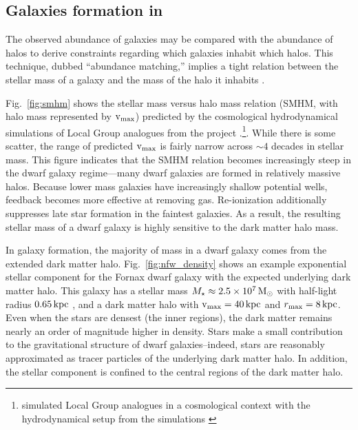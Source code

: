 \subsection{\texorpdfstring{Galaxies formation in
\LCDM{}}{Galaxies formation in }}\label{galaxies-formation-in}

The observed abundance of galaxies may be compared with the abundance of
\LCDM{} halos to derive constraints regarding which galaxies inhabit
which halos. This technique, dubbed ``abundance matching,'' implies a
tight relation between the stellar mass of a galaxy and the mass of the
halo it inhabits \citep{li+white2009, moster+naab+white2013}.

Fig.~\ref{fig:smhm} shows the stellar mass versus halo mass relation
(SMHM, with halo mass represented by \({\rm v}_{\rm max}\)) predicted by the \LCDM{}
cosmological hydrodynamical simulations of Local Group analogues from
the \apostle{} project \citep{sawala+2016}.\footnote{\apostle{}
  simulated Local Group analogues in a \LCDM{} cosmological context with
  the hydrodynamical setup from the \eagle{} simulations
  \citep{crain+2015, schaye+2015}}. While there is some scatter, the
range of predicted \({\rm v}_{\rm max}\) is fairly narrow across \(\sim 4\) decades
in stellar mass. This figure indicates that the SMHM relation becomes
increasingly steep in the dwarf galaxy regime---many dwarf galaxies are
formed in relatively massive halos. Because lower mass galaxies have
increasingly shallow potential wells, feedback becomes more effective at
removing gas. Re-ionization additionally suppresses late star formation
in the faintest galaxies. As a result, the resulting stellar mass of a
dwarf galaxy is highly sensitive to the dark matter halo mass.

In \LCDM{} galaxy formation, the majority of mass in a dwarf galaxy
comes from the extended dark matter halo. Fig.~\ref{fig:nfw_density}
shows an example exponential stellar component for the Fornax dwarf
galaxy with the expected underlying dark matter halo. This galaxy has a
stellar mass \(M_\star \approx 2.5\times10^7\,{\rm M}_{\odot}\) with half-light
radius \(0.65\,{\rm kpc}\) \citep[ with \citet{woo+courteau+dekel2008}
mass-to-light ratio]{munoz+2018}, and a dark matter halo with
\({\rm v}_{\rm max}=40\,{\rm kpc}\) and \(r_{\rm max}=8\,{\rm kpc}\). Even when the stars are
densest (the inner regions), the dark matter remains nearly an order of
magnitude higher in density. Stars make a small contribution to the
gravitational structure of dwarf galaxies--indeed, stars are reasonably
approximated as tracer particles of the underlying dark matter halo. In
addition, the stellar component is confined to the central regions of
the dark matter halo.

